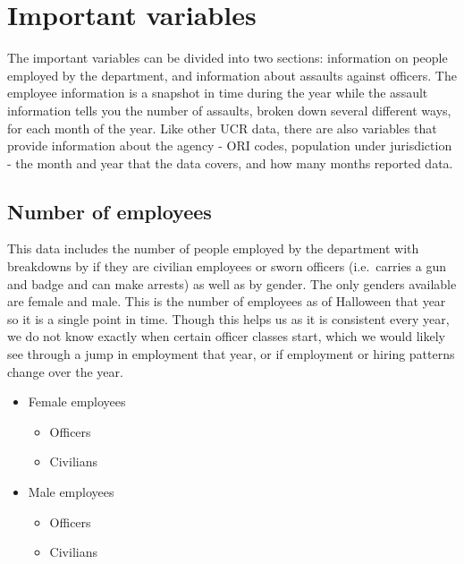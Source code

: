 \documentclass[
]{krantz}
\providecommand{\tightlist}{%
  \setlength{\itemsep}{0pt}\setlength{\parskip}{0pt}}
\begin{document}
\section{Important variables}\label{important-variables-4}

The important variables can be divided into two sections:
information on people employed by the department, and
information about assaults against officers. The employee
information is a snapshot in time during the year while the
assault information tells you the number of assaults, broken
down several different ways, for each month of the year.
Like other UCR data, there are also variables that provide
information about the agency - ORI codes, population under
jurisdiction - the month and year that the data covers, and
how many months reported data.

\subsection{Number of employees}\label{number-of-employees}

This data includes the number of people employed by the
department with breakdowns by if they are civilian employees
or sworn officers (i.e.~carries a gun and badge and can make
arrests) as well as by gender. The only genders available
are female and male. This is the number of employees as of
Halloween that year so it is a single point in time. Though
this helps us as it is consistent every year, we do not know
exactly when certain officer classes start, which we would
likely see through a jump in employment that year, or if
employment or hiring patterns change over the year.

\begin{itemize}
\tightlist
\item
  Female employees

  \begin{itemize}
  \tightlist
  \item
    Officers
  \item
    Civilians
  \end{itemize}
\item
  Male employees

  \begin{itemize}
  \tightlist
  \item
    Officers
  \item
    Civilians
  \end{itemize}
\end{itemize}
\end{document}
